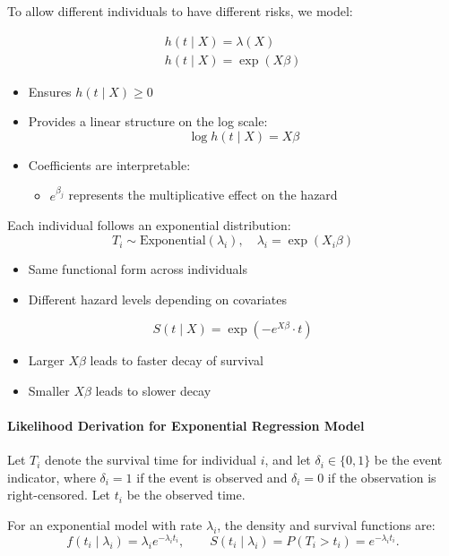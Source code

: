 \documentclass[10pt,a4paper]{article}
\begin{document}
To allow different individuals to have different risks, we model:

\begin{align*}
h(t \mid X) = \lambda(X) \\ 
h(t \mid X) = \exp(X\beta)
\end{align*}



\begin{itemize}
\item Ensures $h(t \mid X) \ge 0$
\item Provides a linear structure on the log scale:
\[
\log h(t \mid X) = X\beta
\]
\item Coefficients are interpretable:
\begin{itemize}
\item $e^{\beta_j}$ represents the multiplicative effect on the hazard
\end{itemize}
\end{itemize}


Each individual follows an exponential distribution:
\[
T_i \sim \text{Exponential}(\lambda_i), \quad \lambda_i = \exp(X_i \beta)
\]

\begin{itemize}
\item Same functional form across individuals
\item Different hazard levels depending on covariates
\end{itemize}


 \[
S(t \mid X) = \exp\left(-e^{X\beta} \cdot t\right)
\]



\begin{itemize}
\item Larger $X\beta$ leads to faster decay of survival
\item Smaller $X\beta$ leads to slower decay
\end{itemize}


\paragraph{Likelihood Derivation for Exponential Regression Model}

Let $T_i$ denote the survival time for individual $i$, and let $\delta_i \in \{0,1\}$ be the event indicator, where $\delta_i = 1$ if the event is observed and $\delta_i = 0$ if the observation is right-censored. Let $t_i$ be the observed time.

For an exponential model with rate $\lambda_i$, the density and survival functions are:
\[
f(t_i \mid \lambda_i) = \lambda_i e^{-\lambda_i t_i}, \qquad
S(t_i \mid \lambda_i) = P(T_i > t_i) = e^{-\lambda_i t_i}.
\]
\end{document}
